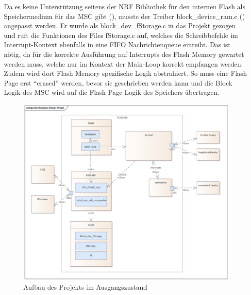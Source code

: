 Da es keine Unterstützung seitens der NRF Bibliothek für den internen Flash als Speichermedium für das \ac{MSC} gibt (\cite{NRF_MSC_Forum}), musste der Treiber block\_device\_ram.c (\cite{NRF_Block_device_RAM}) angepasst werden. Er wurde als block\_dev\_fStorage.c in das Projekt gezogen und ruft die Funktionen des Files fStorage.c auf, welches die Schreibbefehle im Interrupt-Kontext ebenfalls in eine \ac{FIFO} Nachrichtenqueue einreiht. Das ist nötig, da für die korrekte Ausführung auf Interrupts des Flash Memory gewartet werden muss, welche nur im Kontext der Main-Loop korrekt empfangen werden. Zudem wird dort Flash Memory spezifische Logik abstrahiert. So muss eine Flash Page erst ``erased'' werden, bevor sie geschrieben werden kann und die Block Logik des \ac{MSC} wird auf die Flash Page Logik des Speichers übertragen.

\begin{figure}[H] 
	\centering
	\includegraphics[width=\textwidth]{figures/Design_Model.png}
	\caption{Aufbau des Projekts im Ausgangszustand}
	\label{fig:AufbauAusgangszustand}
\end{figure}


